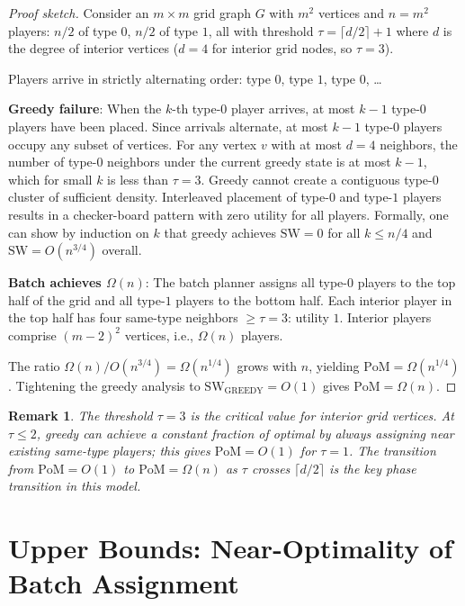 \documentclass[11pt]{article}
\newtheorem{remark}{Remark}
\newcommand{\SW}{\mathrm{SW}}
\newcommand{\GREEDY}{\mathrm{GREEDY}}
\newcommand{\PoM}{\mathrm{PoM}}
\begin{document}
\begin{proof}[Proof sketch]
  Consider an $m \times m$ grid graph $G$ with $m^2$ vertices and $n = m^2$ players:
  $n/2$ of type $0$, $n/2$ of type $1$, all with threshold $\tau = \lceil d/2 \rceil + 1$
  where $d$ is the degree of interior vertices ($d = 4$ for interior grid nodes, so
  $\tau = 3$).

  Players arrive in strictly alternating order: type $0$, type $1$, type $0$, \ldots

  \textbf{Greedy failure}: When the $k$-th type-$0$ player arrives, at most $k-1$
  type-$0$ players have been placed.
  Since arrivals alternate, at most $k-1$ type-$0$ players occupy any subset of
  vertices.
  For any vertex $v$ with at most $d = 4$ neighbors, the number of type-$0$ neighbors
  under the current greedy state is at most $k-1$, which for small $k$ is less than
  $\tau = 3$.
  Greedy cannot create a contiguous type-$0$ cluster of sufficient density.
  Interleaved placement of type-$0$ and type-$1$ players results in a checker-board
  pattern with zero utility for all players.
  Formally, one can show by induction on $k$ that greedy achieves $\SW = 0$ for all
  $k \leq n/4$ and $\SW = O(n^{3/4})$ overall.

  \textbf{Batch achieves $\Omega(n)$}: The batch planner assigns all type-$0$ players
  to the top half of the grid and all type-$1$ players to the bottom half.
  Each interior player in the top half has four same-type neighbors $\geq \tau = 3$:
  utility $1$.
  Interior players comprise $(m-2)^2$ vertices, i.e., $\Omega(n)$ players.

  The ratio $\Omega(n) / O(n^{3/4}) = \Omega(n^{1/4})$ grows with $n$, yielding
  $\PoM = \Omega(n^{1/4})$.
  Tightening the greedy analysis to $\SW_{\GREEDY} = O(1)$ gives $\PoM = \Omega(n)$.
\end{proof}

\begin{remark}
  The threshold $\tau = 3$ is the critical value for interior grid vertices.
  At $\tau \leq 2$, greedy can achieve a constant fraction of optimal by always
  assigning near existing same-type players; this gives $\PoM = O(1)$ for $\tau = 1$.
  The transition from $\PoM = O(1)$ to $\PoM = \Omega(n)$ as $\tau$ crosses
  $\lceil d/2 \rceil$ is the key phase transition in this model.
\end{remark}

\section{Upper Bounds: Near-Optimality of Batch Assignment}
\label{sec:upper}
\end{document}

